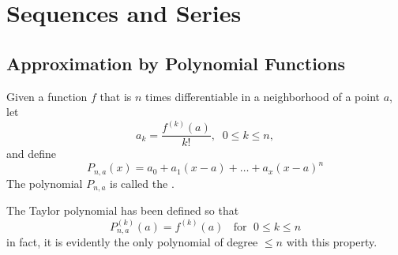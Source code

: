 \chapter{Sequences and Series}

\section{Approximation by Polynomial Functions}

\begin{defn}
    Given a function $f$ that is $n$ times differentiable in a neighborhood of a point $a$, let \begin{equation*}
        a_k = \frac{f^{(k)}(a)}{k!},\;\;0\leq k \leq n,
    \end{equation*}
    and define \begin{equation*}
        P_{n,a}(x) = a_0 + a_1(x-a) + \hdots + a_x(x-a)^n
    \end{equation*}
    The polynomial $P_{n,a}$ is called the . 
\end{defn}

\begin{rmk}
    The Taylor polynomial has been defined so that \begin{equation*}
        P_{n,a}^{(k)}(a) = f^{(k)}(a)\;\;\text{ for }\;0\leq k \leq n
    \end{equation*}
    in fact, it is evidently the only polynomial of degree $\leq n$ with this property.
\end{rmk}

